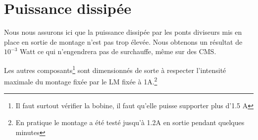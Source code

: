 \documentclass[12pt]{article}
\begin{document}
\section{Puissance dissipée}

Nous nous assurons ici que la puissance dissipée par les ponts diviseurs mis en place en sortie de montage n'est pas trop élevée.
Nous obtenons un résultat de $10^{-3}$ Watt ce qui n'engendrera pas de surchauffe, même sur des CMS.\newline

Les autres composants\footnote{Il faut surtout vérifier la bobine, il faut qu'elle puisse supporter plus d'1.5 A} sont 
dimensionnés de sorte à respecter l'intensité maximale du montage fixée par le LM fixée à 1A.\footnote{En pratique le montage
a été testé jusqu'à 1.2A en sortie pendant quelques minutes}
\end{document}
